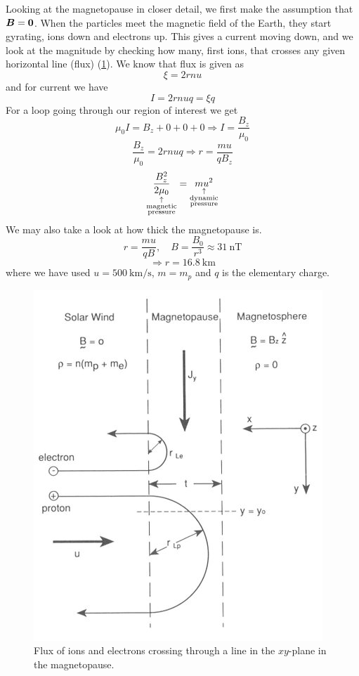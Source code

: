 Looking at the magnetopause in closer detail, we first make the assumption that \(\boldsymbol{B}=\boldsymbol{0}\). When the particles meet the magnetic field of the Earth, they start gyrating, ions down and electrons up. This gives a current moving down, and we look at the magnitude by checking how many, first ions, that crosses any given horizontal line (flux) (\cref{fig:L8_magnetopause_flux}). We know that flux is given as
\begin{equation*}
    \xi=2rnu
\end{equation*}
and for current we have
\begin{equation*}
    I=2r nuq=\xi q
\end{equation*}
For a loop going through our region of interest we get
\begin{equation*}
    \mu_0 I=B_z+0+0+0 \Rightarrow I=\frac{B_z}{\mu_0}
\end{equation*}
\begin{equation*}
    \frac{B_z}{\mu_0}=2r nuq\Rightarrow r=\frac{mu}{qB_z}
\end{equation*}
\begin{equation*}
    \underset{\substack{\uparrow \\ \textnormal{magnetic}\\ \textnormal{pressure}}}{\frac{B_z^2}{2\mu_0}}=\underset{\substack{\uparrow \\ \textnormal{dynamic}\\ \textnormal{pressure}}}{mu^2}
\end{equation*}
We may also take a look at how thick the magnetopause is.
\begin{equation*}
    r=\frac{mu}{qB},\quad B=\frac{B_0}{r^3}\approx \SI{31}{\nano\tesla}
\end{equation*}
\begin{equation*}
    \Rightarrow r=\SI{16.8}{\kilo\metre}
\end{equation*}
where we have used \(u=\SI{500}{\kilo\metre/\second}\), \(m=m_p\) and \(q\) is the elementary charge.
\begin{figure}[t]
    \centering
    \includegraphics[width=.4\linewidth]{bilder/L8_magnetopause_flux.jpeg}
    \caption{Flux of ions and electrons crossing through a line in the \(xy\)-plane in the magnetopause.}\label{fig:L8_magnetopause_flux}
\end{figure}

